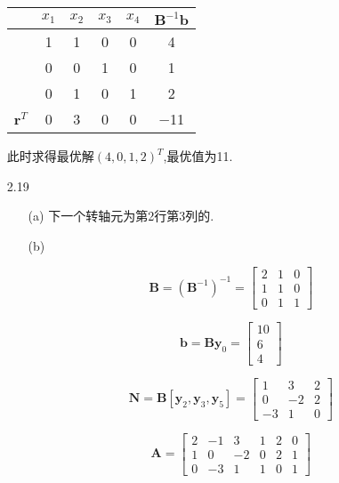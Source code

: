 \documentclass[UTF8]{ctexart}
\begin{document}
\begin{enumerate}
\begin{table}[ht]
\centering
	\begin{tabular}{cccccc}
	\toprule
	{}&$x_1$&$x_2$&$x_3$&$x_4$&$\bm{B}^{-1}\bm{b}$\\
	\midrule
    {}    & 1     & 1     & 0     & 0     & 4 \\
    {}    & 0     & 0     & 1     & 0     & 1 \\
    {}    & 0     & 1     & 0     & 1     & 2 \\
$\bm{r}^T$    & 0     & 3     & 0     & 0     & −11 \\
	\bottomrule
	\end{tabular}
\end{table}

此时求得最优解$(4,0,1,2)^T$,最优值为11.

\clearpage
\item[2.19] 
\begin{enumerate}
\item[(a)] 下一个转轴元为第2行第3列的.
\item[(b)] 

\[\bm{B}=(\bm{B}^{-1})^{-1}=\begin{bmatrix}
    2   & 1  & 0 \\
    1  & 1   & 0 \\
    0 & 1  & 1 
\end{bmatrix}\]

\[\bm{b}=\bm{B}\bm{y}_0=
\begin{bmatrix}
    10 \\
    6 \\
    4
\end{bmatrix}\]

\[\bm{N}=\bm{B}[\bm{y}_2,\bm{y}_3,\bm{y}_5]=
\begin{bmatrix}
    1  & 3  & 2 \\
    0  & -2   & 2 \\
    -3 & 1  & 0 
\end{bmatrix}\]

\[\bm{A}=
\begin{bmatrix}
    2     & −1    & 3     & 1     & 2     & 0 \\
    1     & 0     & −2    & 0     & 2     & 1 \\
    0     & −3    & 1     & 1     & 0     & 1 
\end{bmatrix}\]


\end{enumerate}
\end{enumerate}
\end{document}

